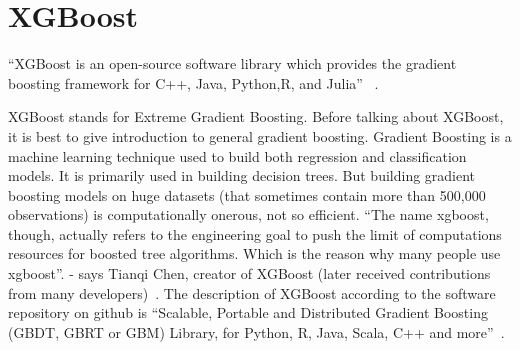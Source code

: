 \section{XGBoost} 

``XGBoost is an open-source software library which provides the
gradient boosting framework for C++, Java, Python,R, and Julia''
~\cite{hid-sp18-401-XGBoost-wiki}.

XGBoost stands for Extreme Gradient Boosting. Before talking about
XGBoost, it is best to give introduction to general gradient
boosting. Gradient Boosting is a machine learning technique used to
build both regression and classification models. It is primarily used
in building decision trees. But building gradient boosting models on
huge datasets (that sometimes contain more than 500,000 observations)
is computationally onerous, not so efficient.  ``The name xgboost,
though, actually refers to the engineering goal to push the limit of
computations resources for boosted tree algorithms. Which is the
reason why many people use xgboost''.  - says Tianqi Chen, creator of
XGBoost (later received contributions from many
developers)~\cite{hid-sp18-401-XGBoost-gen}. The description of
XGBoost according to the software repository on github is ``Scalable,
Portable and Distributed Gradient Boosting (GBDT, GBRT or GBM)
Library, for Python, R, Java, Scala, C++ and
more''~\cite{hid-sp18-401-XGBoost-git}.
